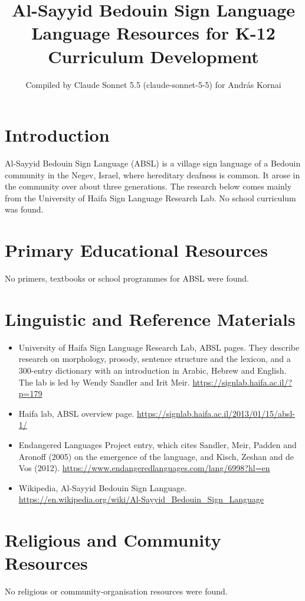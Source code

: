 \documentclass[12pt]{article}
\title{Al-Sayyid Bedouin Sign Language Language Resources for K-12 Curriculum Development}
\author{Compiled by Claude Sonnet 5.5 (claude-sonnet-5-5) for Andr\'as Kornai}
\date{}
\begin{document}
\maketitle

\section{Introduction}
Al-Sayyid Bedouin Sign Language (ABSL) is a village sign language of a Bedouin community in the Negev, Israel, where hereditary deafness is common. It arose in the community over about three generations. The research below comes mainly from the University of Haifa Sign Language Research Lab. No school curriculum was found.

\section{Primary Educational Resources}
No primers, textbooks or school programmes for ABSL were found.

\section{Linguistic and Reference Materials}
\begin{itemize}
\item University of Haifa Sign Language Research Lab, ABSL pages. They describe research on morphology, prosody, sentence structure and the lexicon, and a 300-entry dictionary with an introduction in Arabic, Hebrew and English. The lab is led by Wendy Sandler and Irit Meir. \url{https://signlab.haifa.ac.il/?p=179}
\item Haifa lab, ABSL overview page. \url{https://signlab.haifa.ac.il/2013/01/15/absl-1/}
\item Endangered Languages Project entry, which cites Sandler, Meir, Padden and Aronoff (2005) on the emergence of the language, and Kisch, Zeshan and de Vos (2012). \url{https://www.endangeredlanguages.com/lang/6998?hl=en}
\item Wikipedia, Al-Sayyid Bedouin Sign Language. \url{https://en.wikipedia.org/wiki/Al-Sayyid_Bedouin_Sign_Language}
\end{itemize}

\section{Religious and Community Resources}
No religious or community-organisation resources were found.
\end{document}
